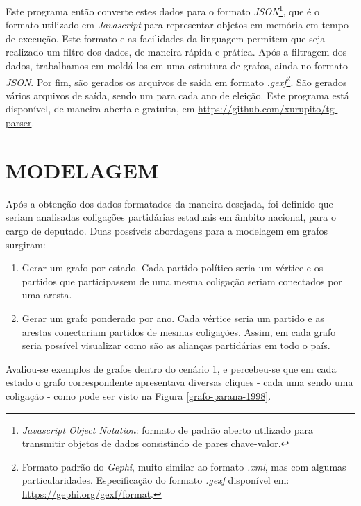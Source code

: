 Este programa então converte estes dados para o formato \emph{JSON}\footnote{\emph{Javascript Object Notation}: formato de padrão aberto utilizado para transmitir objetos de dados consistindo de pares chave-valor.}, que é o formato utilizado em \emph{Javascript} para representar objetos em memória em tempo de execução. Este formato e as facilidades da linguagem permitem que seja realizado um filtro dos dados, de maneira rápida e prática. Após a filtragem dos dados, trabalhamos em moldá-los em uma estrutura de grafos, ainda no formato \emph{JSON}. Por fim, são gerados os arquivos de saída em formato \emph{.gexf}\footnote{Formato padrão do \emph{Gephi}, muito similar ao formato \emph{.xml}, mas com algumas particularidades. Especificação do formato \emph{.gexf} disponível em: \url{https://gephi.org/gexf/format}.}. São gerados vários arquivos de saída, sendo um para cada ano de eleição. Este programa está disponível, de maneira aberta e gratuita, em \url{https://github.com/xurupito/tg-parser}.

\section{\texorpdfstring{\MakeUppercase{Modelagem}}{}}
\label{proposta__modelagem}

Após a obtenção dos dados formatados da maneira desejada, foi definido que seriam analisadas coligações partidárias estaduais em âmbito nacional, para o cargo de deputado. Duas possíveis abordagens para a modelagem em grafos surgiram:
\begin{enumerate}
    \item Gerar um grafo por estado. Cada partido político seria um vértice e os partidos que participassem de uma mesma coligação seriam conectados por uma aresta.
    \item Gerar um grafo ponderado por ano. Cada vértice seria um partido e as arestas conectariam partidos de mesmas coligações. Assim, em cada grafo seria possível visualizar como são as alianças partidárias em todo o país.
\end{enumerate}

Avaliou-se exemplos de grafos dentro do cenário 1, e percebeu-se que em cada estado o grafo correspondente apresentava diversas cliques - cada uma sendo uma coligação - como pode ser visto na Figura \ref{grafo-parana-1998}.

